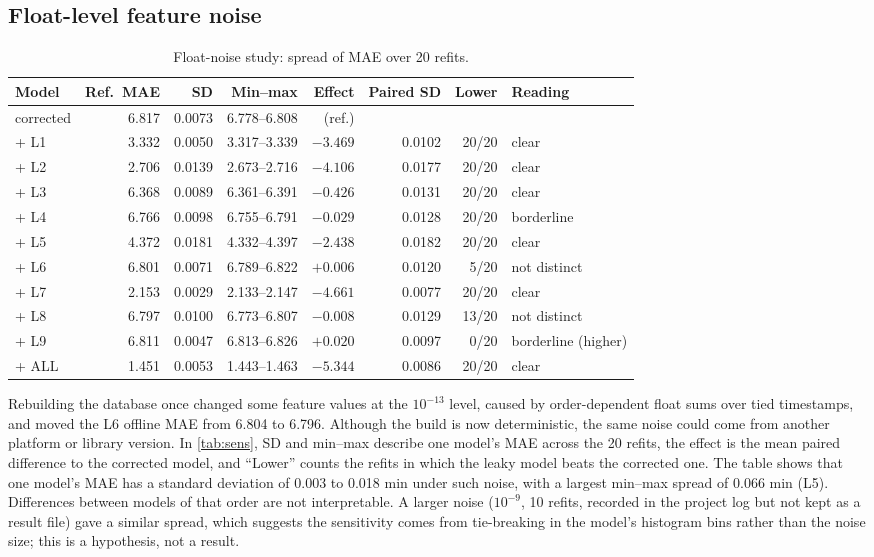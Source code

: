 \documentclass[11pt,a4paper]{article}
\begin{document}
\subsection{Float-level feature noise}\label{sec:sens}
\begin{table}[H]
\centering\footnotesize
\caption{Float-noise study: spread of MAE over 20 refits.}
\label{tab:sens}
\begin{tabular}{@{}l r r r r r r l@{}}
\toprule
Model & Ref.\ MAE & SD & Min--max & Effect & Paired SD & Lower & Reading \\
\midrule
corrected & 6.817 & 0.0073 & 6.778--6.808 & (ref.) & & & \\
+ L1 & 3.332 & 0.0050 & 3.317--3.339 & $-3.469$ & 0.0102 & 20/20 & clear \\
+ L2 & 2.706 & 0.0139 & 2.673--2.716 & $-4.106$ & 0.0177 & 20/20 & clear \\
+ L3 & 6.368 & 0.0089 & 6.361--6.391 & $-0.426$ & 0.0131 & 20/20 & clear \\
+ L4 & 6.766 & 0.0098 & 6.755--6.791 & $-0.029$ & 0.0128 & 20/20 & borderline \\
+ L5 & 4.372 & 0.0181 & 4.332--4.397 & $-2.438$ & 0.0182 & 20/20 & clear \\
+ L6 & 6.801 & 0.0071 & 6.789--6.822 & $+0.006$ & 0.0120 & 5/20 & not distinct \\
+ L7 & 2.153 & 0.0029 & 2.133--2.147 & $-4.661$ & 0.0077 & 20/20 & clear \\
+ L8 & 6.797 & 0.0100 & 6.773--6.807 & $-0.008$ & 0.0129 & 13/20 & not distinct \\
+ L9 & 6.811 & 0.0047 & 6.813--6.826 & $+0.020$ & 0.0097 & 0/20 & borderline (higher) \\
+ ALL & 1.451 & 0.0053 & 1.443--1.463 & $-5.344$ & 0.0086 & 20/20 & clear \\
\bottomrule
\end{tabular}
\end{table}

Rebuilding the database once changed some feature values at the $10^{-13}$ level, caused by order-dependent float sums over tied timestamps, and moved the L6 offline MAE from 6.804 to 6.796. Although the build is now deterministic, the same noise could come from another platform or library version. In \autoref{tab:sens}, SD and min--max describe one model's MAE across the 20 refits, the effect is the mean paired difference to the corrected model, and ``Lower'' counts the refits in which the leaky model beats the corrected one. The table shows that one model's MAE has a standard deviation of 0.003 to 0.018 min under such noise, with a largest min--max spread of 0.066 min (L5). Differences between models of that order are not interpretable. A larger noise ($10^{-9}$, 10 refits, recorded in the project log but not kept as a result file) gave a similar spread, which suggests the sensitivity comes from tie-breaking in the model's histogram bins rather than the noise size; this is a hypothesis, not a result.
\end{document}
